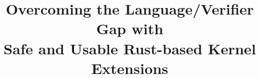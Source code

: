 \documentclass[sigplan,screen,nonacm]{acmart}
\begin{document}
\title[Overcoming the Language/Verifier Gap with Safe and Usable Rust-based Kernel Extensions]{Overcoming the Language/Verifier Gap with\\ Safe and Usable Rust-based Kernel Extensions}







\maketitle














% 
\end{document}
